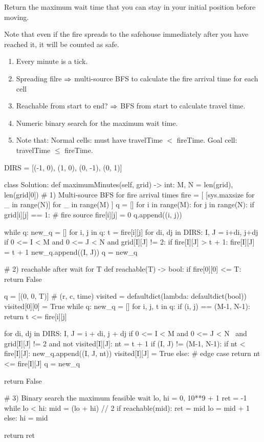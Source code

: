 Return the maximum wait time that you can stay in your initial position before moving.

Note that even if the fire spreads to the safehouse immediately after you have reached it, it will be counted as safe.

\begin{enumerate}
\item Every minute is a tick. 
\item Spreading filre $\Rightarrow$ multi-source BFS to calculate the fire arrival time for each cell
\item Reachable from start to end? $\Rightarrow$ BFS from start to calculate travel time.
\item Numeric binary search for the maximum wait time. 
\item Note that: Normal cells: must have travelTime $<$ fireTime. Goal cell: travelTime $\leq$ fireTime.
\end{enumerate}
\begin{python}
DIRS = [(-1, 0), (1, 0), (0, -1), (0, 1)]

class Solution:
  def maximumMinutes(self, grid) -> int:
    M, N = len(grid), len(grid[0])
    # 1) Multi-source BFS for fire arrival times
    fire = [
      [sys.maxsize for _ in range(N)] 
      for _ in range(M)
    ]
    q = []
    for i in range(M):
      for j in range(N):
        if grid[i][j] == 1:  # fire source
          fire[i][j] = 0
          q.append((i, j))

    while q:
      new_q = []
      for i, j in q:
        t = fire[i][j]
        for di, dj in DIRS:
          I, J = i+di, j+dj
          if 0 <= I < M and 0 <= J < N and grid[I][J] != 2:
            if fire[I][J] > t + 1:
              fire[I][J] = t + 1
              new_q.append((I, J))
      q = new_q
	
    # 2) reachable after wait for T
    def reachable(T) -> bool:
      if fire[0][0] <= T:
        return False

      q = [(0, 0, T)]  # (r, c, time)
      visited = defaultdict(lambda: defaultdict(bool))
      visited[0][0] = True
      while q:
        new_q = []
        for i, j, t in q:
          if (i, j) == (M-1, N-1):
            return t <= fire[i][j]

          for di, dj in DIRS:
            I, J = i + di, j + dj
            if 0 <= I < M and 0 <= J < N \
              and grid[I][J] != 2 and not visited[I][J]:
              nt = t + 1
              if (I, J) != (M-1, N-1):
                if nt < fire[I][J]:
                  new_q.append((I, J, nt))
                  visited[I][J] = True
              else:
                # edge case
                return nt <= fire[I][J]
        q = new_q

      return False

    # 3) Binary search the maximum feasible wait
    lo, hi = 0, 10**9 + 1
    ret = -1
    while lo < hi:
      mid = (lo + hi) // 2
      if reachable(mid):
        ret = mid
        lo = mid + 1
      else:
        hi = mid

    return ret
\end{python}

